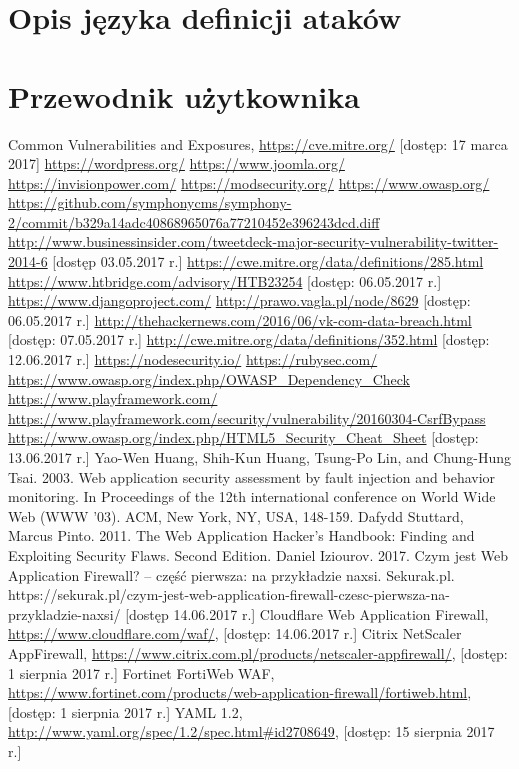 \documentclass[11pt,a4paper,polish,thesis]{dcsbook}
\begin{document}
\appendix
\chapter{Opis języka definicji ataków}
\label{opisjezyka}
\chapter{Przewodnik użytkownika}

\backmatter

\begin{thebibliography}{1}
 Common Vulnerabilities and Exposures, \url{https://cve.mitre.org/} [dostęp: 17 marca 2017]
 \url{https://wordpress.org/}
 \url{https://www.joomla.org/}
 \url{https://invisionpower.com/}
 \url{https://modsecurity.org/}
\url{ https://www.owasp.org/}
 \url{https://github.com/symphonycms/symphony-2/commit/b329a14adc40868965076a77210452e396243dcd.diff}
 \url{http://www.businessinsider.com/tweetdeck-major-security-vulnerability-twitter-2014-6} [dostęp 03.05.2017 r.]
 \url{https://cwe.mitre.org/data/definitions/285.html}
 \url{https://www.htbridge.com/advisory/HTB23254} [dostęp: 06.05.2017 r.]
 \url{https://www.djangoproject.com/}
 \url{http://prawo.vagla.pl/node/8629} [dostęp: 06.05.2017 r.]
 \url{http://thehackernews.com/2016/06/vk-com-data-breach.html} [dostęp: 07.05.2017 r.]
 \url{http://cwe.mitre.org/data/definitions/352.html} [dostęp: 12.06.2017 r.]
 \url{https://nodesecurity.io/}
 \url{https://rubysec.com/}
 \url{https://www.owasp.org/index.php/OWASP\_Dependency\_Check}
 \url{https://www.playframework.com/}
 \url{https://www.playframework.com/security/vulnerability/20160304-CsrfBypass}
 \url{https://www.owasp.org/index.php/HTML5\_Security\_Cheat\_Sheet} [dostęp: 13.06.2017 r.]
 Yao-Wen Huang, Shih-Kun Huang, Tsung-Po Lin, and Chung-Hung Tsai. 2003. Web application security assessment by fault injection and behavior monitoring. In Proceedings of the 12th international conference on World Wide Web (WWW '03). ACM, New York, NY, USA, 148-159.
 Dafydd Stuttard, Marcus Pinto. 2011. The Web Application Hacker's Handbook: Finding and Exploiting Security Flaws. Second Edition.
 Daniel Iziourov. 2017. Czym jest Web Application Firewall? – część pierwsza: na przykładzie naxsi. Sekurak.pl. https://sekurak.pl/czym-jest-web-application-firewall-czesc-pierwsza-na-przykladzie-naxsi/ [dostęp 14.06.2017 r.]
 Cloudflare Web Application Firewall, \url{https://www.cloudflare.com/waf/}, [dostęp: 14.06.2017 r.]
 Citrix NetScaler AppFirewall, \url{https://www.citrix.com.pl/products/netscaler-appfirewall/}, [dostęp: 1 sierpnia 2017 r.]
 Fortinet FortiWeb WAF, \url{https://www.fortinet.com/products/web-application-firewall/fortiweb.html}, [dostęp: 1 sierpnia 2017 r.]
 YAML 1.2, \url{http://www.yaml.org/spec/1.2/spec.html#id2708649}, [dostęp: 15 sierpnia 2017 r.]
\end{thebibliography}
\end{document}
